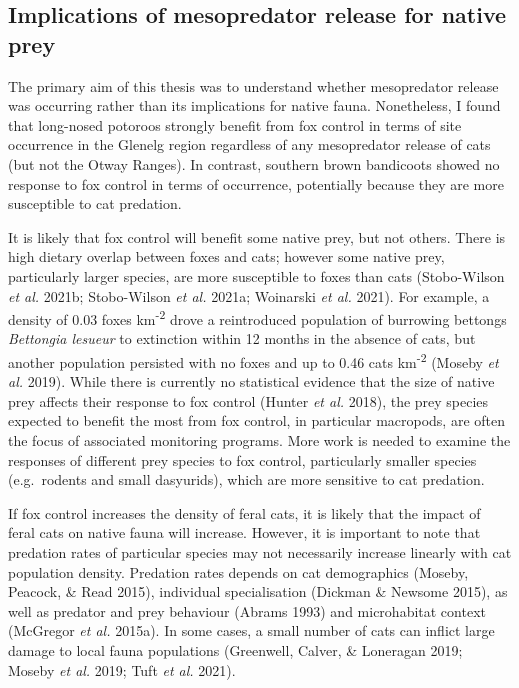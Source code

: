 \documentclass[11pt,a4paper,titlepage,twoside,openright]{style/unimelbthesis}
\begin{document}
\begin{mainmatter}
\hypertarget{implications-of-mesopredator-release-for-native-prey}{%
\section{Implications of mesopredator release for native prey}\label{implications-of-mesopredator-release-for-native-prey}}

The primary aim of this thesis was to understand whether mesopredator release was occurring rather than its implications for native fauna. Nonetheless, I found that long-nosed potoroos strongly benefit from fox control in terms of site occurrence in the Glenelg region regardless of any mesopredator release of cats (but not the Otway Ranges). In contrast, southern brown bandicoots showed no response to fox control in terms of occurrence, potentially because they are more susceptible to cat predation.

It is likely that fox control will benefit some native prey, but not others. There is high dietary overlap between foxes and cats; however some native prey, particularly larger species, are more susceptible to foxes than cats (Stobo-Wilson \emph{et al.} 2021b; Stobo-Wilson \emph{et al.} 2021a; Woinarski \emph{et al.} 2021). For example, a density of 0.03 foxes km\textsuperscript{-2} drove a reintroduced population of burrowing bettongs \emph{Bettongia lesueur} to extinction within 12 months in the absence of cats, but another population persisted with no foxes and up to 0.46 cats km\textsuperscript{-2} (Moseby \emph{et al.} 2019). While there is currently no statistical evidence that the size of native prey affects their response to fox control (Hunter \emph{et al.} 2018), the prey species expected to benefit the most from fox control, in particular macropods, are often the focus of associated monitoring programs. More work is needed to examine the responses of different prey species to fox control, particularly smaller species (e.g.~rodents and small dasyurids), which are more sensitive to cat predation.

If fox control increases the density of feral cats, it is likely that the impact of feral cats on native fauna will increase. However, it is important to note that predation rates of particular species may not necessarily increase linearly with cat population density. Predation rates depends on cat demographics (Moseby, Peacock, \& Read 2015), individual specialisation (Dickman \& Newsome 2015), as well as predator and prey behaviour (Abrams 1993) and microhabitat context (McGregor \emph{et al.} 2015a). In some cases, a small number of cats can inflict large damage to local fauna populations (Greenwell, Calver, \& Loneragan 2019; Moseby \emph{et al.} 2019; Tuft \emph{et al.} 2021).


\end{mainmatter}
\end{document}
